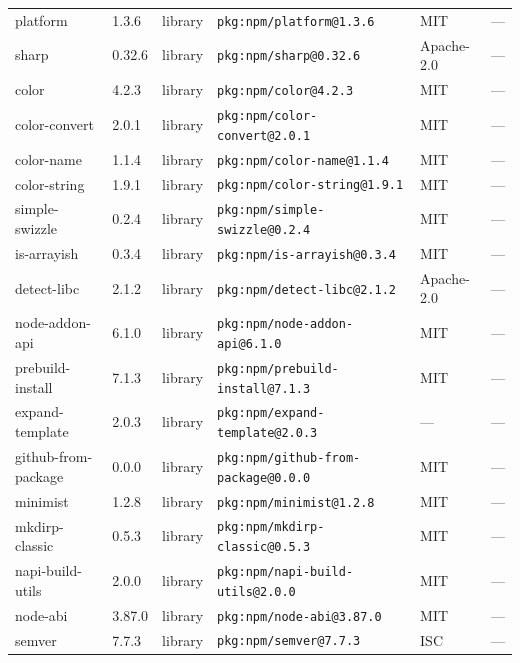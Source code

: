 \documentclass[11pt,a4paper]{article}
\begin{document}
\begin{longtable}{|p{4cm}|p{2cm}|p{1.6cm}|p{5cm}|p{1.5cm}|p{3.5cm}|}
\raggedright platform & 1.3.6 & library & \small\texttt{pkg:npm/platform@1.3.6} & MIT & \small — \\
\raggedright sharp & 0.32.6 & library & \small\texttt{pkg:npm/sharp@0.32.6} & Apache-2.0 & \small — \\
\raggedright color & 4.2.3 & library & \small\texttt{pkg:npm/color@4.2.3} & MIT & \small — \\
\raggedright color-convert & 2.0.1 & library & \small\texttt{pkg:npm/color-convert@2.0.1} & MIT & \small — \\
\raggedright color-name & 1.1.4 & library & \small\texttt{pkg:npm/color-name@1.1.4} & MIT & \small — \\
\raggedright color-string & 1.9.1 & library & \small\texttt{pkg:npm/color-string@1.9.1} & MIT & \small — \\
\raggedright simple-swizzle & 0.2.4 & library & \small\texttt{pkg:npm/simple-swizzle@0.2.4} & MIT & \small — \\
\raggedright is-arrayish & 0.3.4 & library & \small\texttt{pkg:npm/is-arrayish@0.3.4} & MIT & \small — \\
\raggedright detect-libc & 2.1.2 & library & \small\texttt{pkg:npm/detect-libc@2.1.2} & Apache-2.0 & \small — \\
\raggedright node-addon-api & 6.1.0 & library & \small\texttt{pkg:npm/node-addon-api@6.1.0} & MIT & \small — \\
\raggedright prebuild-install & 7.1.3 & library & \small\texttt{pkg:npm/prebuild-install@7.1.3} & MIT & \small — \\
\raggedright expand-template & 2.0.3 & library & \small\texttt{pkg:npm/expand-template@2.0.3} & — & \small — \\
\raggedright github-from-package & 0.0.0 & library & \small\texttt{pkg:npm/github-from-package@0.0.0} & MIT & \small — \\
\raggedright minimist & 1.2.8 & library & \small\texttt{pkg:npm/minimist@1.2.8} & MIT & \small — \\
\raggedright mkdirp-classic & 0.5.3 & library & \small\texttt{pkg:npm/mkdirp-classic@0.5.3} & MIT & \small — \\
\raggedright napi-build-utils & 2.0.0 & library & \small\texttt{pkg:npm/napi-build-utils@2.0.0} & MIT & \small — \\
\raggedright node-abi & 3.87.0 & library & \small\texttt{pkg:npm/node-abi@3.87.0} & MIT & \small — \\
\raggedright semver & 7.7.3 & library & \small\texttt{pkg:npm/semver@7.7.3} & ISC & \small — \\

\end{longtable}
\end{document}
